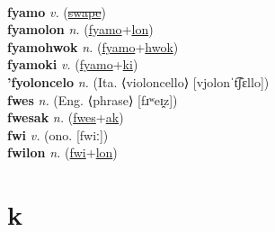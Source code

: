  \label{'futpol} \\
\textbf{fyamo} \textit{v.} (\hyperref[swape]{\sout{swape}})
 \label{fyamo} \\
\textbf{fyamolon} \textit{n.} (\hyperref[fyamo]{fyamo}+\hyperref[lon]{lon})
 \label{fyamolon} \\
\textbf{fyamohwok} \textit{n.} (\hyperref[fyamo]{fyamo}+\hyperref[hwok]{hwok})
 \label{fyamohwok} \\
\textbf{fyamoki} \textit{v.} (\hyperref[fyamo]{fyamo}+\hyperref[ki]{ki})
 \label{fyamoki} \\
\textbf{'fyoloncelo} \textit{n.} (Ita. ⟨violoncello⟩ [vjolonˈt͡ʃɛllo])
 \label{'fyoloncelo} \\
\textbf{fwes} \textit{n.} (Eng. ⟨phrase⟩ [fɹʷeɪ̯z])
 \label{fwes} \\
\textbf{fwesak} \textit{n.} (\hyperref[fwes]{fwes}+\hyperref[ak]{ak})
 \label{fwesak} \\
\textbf{fwi} \textit{v.} (ono. [fwiː])
 \label{fwi} \\
\textbf{fwilon} \textit{n.} (\hyperref[fwi]{fwi}+\hyperref[lon]{lon})
 \label{fwilon} 

\section{k}

